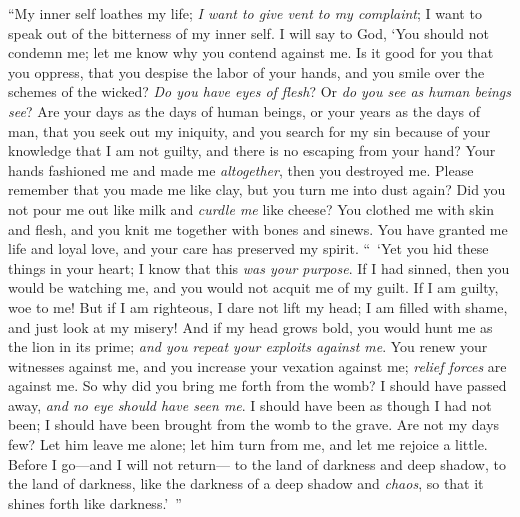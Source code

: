 \begin{biblechapter} %
 “My inner self loathes my life; 
\textit{I want to give vent to my complaint}; 
I want to speak out of the bitterness of my inner self.
\verse I will say to God, ‘You should not condemn me; 
let me know why you contend against me.
\verse Is it good for you that you oppress, 
that you despise the labor of your hands, 
and you smile over the schemes of the wicked?
\verse \textit{Do you have eyes of flesh}? 
Or \textit{do you see as human beings see}?
\verse Are your days as the days of human beings, 
or your years as the days of man,
\verse that you seek out my iniquity, 
and you search for my sin
\verse because of your knowledge that I am not guilty, 
and there is no escaping from your hand?
\verse Your hands fashioned me and made me \textit{altogether}, 
then you destroyed me.
\verse Please remember that you made me like clay, 
but you turn me into dust again?
\verse Did you not pour me out like milk 
and \textit{curdle me} like cheese?
\verse You clothed me with skin and flesh, 
and you knit me together with bones and sinews.
\verse You have granted me life and loyal love, 
and your care has preserved my spirit.
\verse “ ‘Yet you hid these things in your heart; 
I know that this \textit{was your purpose}.
\verse If I had sinned, then you would be watching me, 
and you would not acquit me of my guilt.
\verse If I am guilty, woe to me! 
But if I am righteous, I dare not lift my head; 
I am filled with shame, and just look at my misery!
\verse And if my head grows bold, you would hunt me as the lion in its prime; 
\textit{and you repeat your exploits against me}.
\verse You renew your witnesses against me, 
and you increase your vexation against me; 
\textit{relief forces} are against me.
\verse So why did you bring me forth from the womb? 
I should have passed away, \textit{and no eye should have seen me}.
\verse I should have been as though I had not been; 
I should have been brought from the womb to the grave.
\verse Are not my days few? Let him leave me alone; 
let him turn from me, and let me rejoice a little.
\verse Before I go—and I will not return— 
to the land of darkness and deep shadow,
\verse to the land of darkness, 
like the darkness of a deep shadow and \textit{chaos}, 
so that it shines forth like darkness.’ ”
\end{biblechapter}

